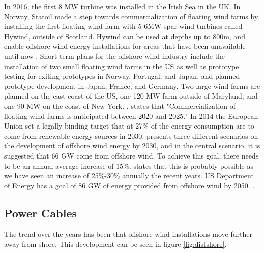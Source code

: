  \noindent In 2016, the first 8 MW turbine was installed in the Irish Sea in the UK. In Norway, Statoil made a step towards commercialization of floating wind farms by installing the first floating wind farm with 5 6MW spar wind turbines called Hywind, outside of Scotland. Hywind can be used at depths up to 800m, and enable offshore wind energy installations for areas that have been unavailable until now \cite{Equinor2018}. Short-term plans for the offshore wind industry include the installation of two small floating wind farms in the US as well as prototype testing for exiting prototypes in Norway, Portugal, and Japan, and planned prototype development in Japan, France, and Germany.  Two large wind farms are planned on the east coast of the US, one 120 MW farm outside of Maryland, and one 90 MW on the coast of New York. \cite{Gao2018}. \newline
 \newline
 \cite{Bailey2014} states that "Commercialization of floating wind farms is
anticipated between 2020 and 2025." In 2014 the European Union set a legally binding target that at 27\% of the energy consumption are to come from renewable energy sources in 2030. \cite{EWEA2015}  presents three different scenarios on the development of offshore wind energy by 2030, and in the central scenario, it is suggested that 66 GW come from offshore wind. To achieve this goal, there needs to be an annual average increase of 15\%. \cite{Gao2018} states that this is probably possible as we have seen an increase of 25\%-30\% annually the recent years. US Department of Energy has a goal of 86 GW of energy provided from offshore wind by 2050. \cite{windus2016}. 
\subsection{Power Cables}
The trend over the years has been that offshore wind installations move further away from shore. This development can be seen in figure \ref{fig:distshore}. 

